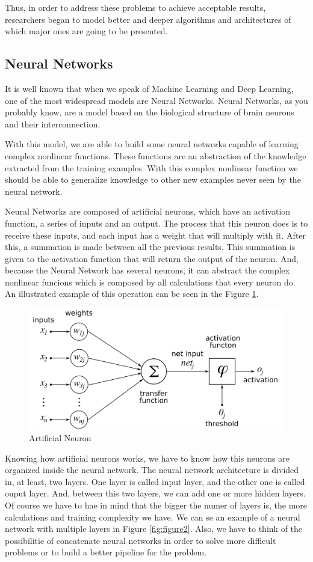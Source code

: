 \documentclass[12pt]{article}
\begin{document}
Thus, in order to address these problems to achieve acceptable results, researchers began to model better and deeper algorithms and architectures of which major ones are going to be presented.

\subsection{Neural Networks}
\label{sec:Neural Networks}
It is well known that when we speak of Machine Learning and Deep Learning, one of the most widespread models are Neural Networks. Neural Networks, as you probably know, are a model based on the biological structure of brain neurons and their interconnection.

With this model, we are able to build some neural networks capable of learning complex nonlinear functions. These functions are an abstraction of the knowledge extracted from the training examples. With this complex nonlinear function we should be able to generalize knowledge to other new examples never seen by the neural network.

Neural Networks are composed of artificial neurons, which have an activation function, a series of inputs and an output. The process that this neuron does is to receive these inputs, and each input has a weight that will multiply with it. After this, a summation is made between all the previous results. This summation is given to the activation function that will return the output of the neuron. And, because the Neural Network has several neurons, it can abstract the complex nonlinear funcions which is composed by all calculations that every neuron do. An illustrated example of this operation can be seen in the Figure \ref{fig:figure1}.

\begin{figure}[ht]
\centering
\includegraphics[width=.4\textwidth]{Neuron.png}
\caption{Artificial Neuron}
\label{fig:figure1}
\end{figure}

Knowing how artificial neurons works, we have to know how this neurons are organized inside the neural network. The neural network architecture is divided in, at least, two layers. One layer is called input layer, and the other one is called ouput layer. And, between this two layers, we can add one or more hidden layers. Of course we have to hae in mind that the bigger the numer of layers is, the more calculations and training complexity we have. We can se an example of a neural network with multiple layers in Figure \ref{fig:figure2}. Also, we have to think of the possibilitie of concatenate neural networks in order to solve more difficult problems or to build a better pipeline for the problem.
\end{document}
